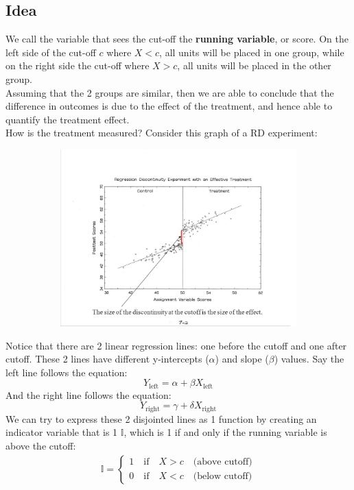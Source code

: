 \documentclass{article}
\begin{document}
\subsection{Idea}
We call the variable that sees the cut-off the \textbf{running variable}, or score. 
On the left side of the cut-off $c$ where $X<c$, all units will be placed in one group, while on the right side the cut-off where $X>c$, all units will be placed in the other group.
\\
Assuming that the 2 groups are similar, then we are able to conclude that the difference in outcomes is due to the effect of the treatment, and hence able to quantify the treatment effect.
\\
How is the treatment measured? 
Consider this graph of a RD experiment:
\begin{figure}[h!]
  \centering
  \begin{subfigure}{0.6\linewidth}
    \includegraphics[width=\linewidth]{RD.jpg}
  \end{subfigure} 
\end{figure}
Notice that there are 2 linear regression lines: one before the cutoff and one after cutoff.
These 2 lines have different y-intercepts ($\alpha$) and slope ($\beta$) values.
Say the left line follows the equation:
$$Y_{\text{left}} = \alpha + \beta X_{\text{left}}$$
And the right line follows the equation:
$$Y_{\text{right}} = \gamma + \delta X_{\text{right}}$$
We can try to express these 2 disjointed lines as 1 function by creating an indicator variable that is 1 $\mathbb{I}$, which is 1 if and only if the running variable is above the cutoff:
\begin{gather*}
        \mathbb{I} =
        \begin{cases}
            1 \quad \text{if} \quad X > c \quad \text{(above cutoff)} \\
            0 \quad \text{if} \quad X < c \quad \text{(below cutoff)}
        \end{cases}
\end{gather*}
\end{document}
